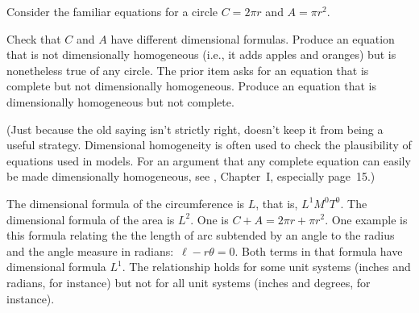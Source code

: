 \begin{exercises}
    Consider the familiar equations for a circle $C=2\pi r$ and $A=\pi r^2$.
    \begin{exparts}
      \partsitem Check that $C$ and $A$ have different dimensional formulas.
      \partsitem Produce an equation that is not
        dimensionally homogeneous (i.e., 
        it adds apples and oranges) but is nonetheless true of any circle.
      \partsitem The prior item asks for an equation that is complete but
        not dimensionally homogeneous.
        Produce an equation that is dimensionally homogeneous but not complete.
    \end{exparts}
    (Just because the old saying isn't strictly right, doesn't 
    keep it from being a useful strategy.
    Dimensional homogeneity is often used to check the plausibility of 
    equations used in models.
    For an argument that any complete equation can easily be made 
     dimensionally homogeneous, see \cite{Bridgman}, Chapter~I, 
     especially page~15.)
    \begin{answer}
      \begin{exparts}
        \partsitem The dimensional formula of the circumference is $L$,
          that is, $L^1M^0T^0$.
          The dimensional formula of the area is $L^2$.
        \partsitem One is $C+A=2\pi r + \pi r^2$.
        \partsitem One example is this formula relating the  
           the length of arc subtended by an angle to the radius and the
           angle measure in radians:~$\ell-r\theta=0$.
           Both terms in that formula have dimensional
           formula $L^1$.
           The relationship holds for some
           unit systems (inches and radians, for instance) but not for all
           unit systems (inches and degrees, for instance).  
      \end{exparts}
    \end{answer}
\end{exercises}
\endinput